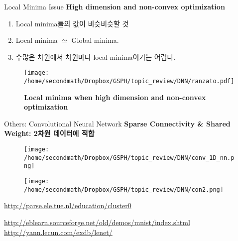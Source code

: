 \documentclass{beamer}
\begin{document}
\begin{frame}{Local Minima Issue}
\textbf{High dimension and non-convex optimization} 
\begin{enumerate}
  \item Local minima들의 값이 비슷비슷할 것
  \item Local minima $\simeq$ Global minima. 
  \item 수많은 차원에서 차원마다 local minima이기는 어렵다.  
\end{enumerate}
\end{frame}

\begin{frame}
\begin{figure}[!ht]
\centering
\texttt{[image: /home/secondmath/Dropbox/GSPH/topic\_review/DNN/ranzato.pdf]}
\caption{\bf{Local minima when high dimension and non-convex optimization \citep{minima}}}
\end{figure}
\end{frame}



\begin{frame}{Others: Convolutional Neural Network}
\textbf{Sparse Connectivity \& Shared Weight: 2차원 데이터에 적합}\citep{convol}
\begin{figure}[!ht]
\centering
\texttt{[image: /home/secondmath/Dropbox/GSPH/topic\_review/DNN/conv\_1D\_nn.png]}
\end{figure}
\end{frame}

\begin{frame}
\begin{figure}[!ht]
\centering
\texttt{[image: /home/secondmath/Dropbox/GSPH/topic\_review/DNN/con2.png]}
\end{figure}
\url{http://parse.ele.tue.nl/education/cluster0}
\end{frame}


\begin{frame}
\begin{figure}
\end{figure}
\url{http://eblearn.sourceforge.net/old/demos/mnist/index.shtml}\\ \url{http://yann.lecun.com/exdb/lenet/}
\end{frame}
\end{document}
